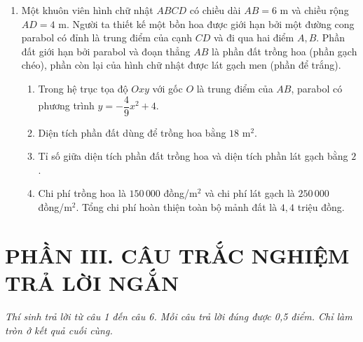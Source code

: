 \documentclass[12pt,a4paper]{article}
\begin{document}
\begin{enumerate}
\item \begin{minipage}[t]{0.56\linewidth}
Một khuôn viên hình chữ nhật $ABCD$ có chiều dài $AB = 6\text{ m}$ và chiều rộng $AD = 4\text{ m}$. Người ta thiết kế một bồn hoa được giới hạn bởi một đường cong parabol có đỉnh là trung điểm của cạnh $CD$ và đi qua hai điểm $A, B$. Phần đất giới hạn bởi parabol và đoạn thẳng $AB$ là phần đất trồng hoa (phần gạch chéo), phần còn lại của hình chữ nhật được lát gạch men (phần để trắng).
\begin{enumerate}
\item Trong hệ trục tọa độ $Oxy$ với gốc $O$ là trung điểm của $AB$, parabol có phương trình $y = -\dfrac{4}{9}x^2 + 4$.
\item Diện tích phần đất dùng để trồng hoa bằng $18\text{ m}^2$.
\item Tỉ số giữa diện tích phần đất trồng hoa và diện tích phần lát gạch bằng $2$.
\item Chi phí trồng hoa là $150\,000$ đồng/m$^2$ và chi phí lát gạch là $250\,000$ đồng/m$^2$. Tổng chi phí hoàn thiện toàn bộ mảnh đất là $4{,}4$ triệu đồng.
\end{enumerate}
\end{minipage}\hfill
\begin{minipage}[t]{0.41\linewidth}
\vspace{-0.3\baselineskip}
\centering
{}
\end{minipage}
\end{enumerate}

\section*{\large PHẦN III. CÂU TRẮC NGHIỆM TRẢ LỜI NGẮN}
\textit{Thí sinh trả lời từ câu 1 đến câu 6. Mỗi câu trả lời đúng được 0,5 điểm. Chỉ làm tròn ở kết quả cuối cùng.}
\end{document}
